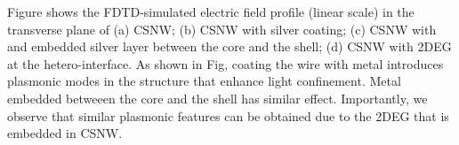 Figure shows the FDTD-simulated electric field profile (linear scale) in the
transverse plane of (a) CSNW; (b) CSNW with silver coating; (c) CSNW with and
embedded silver layer between the core and the shell; (d) CSNW with 2DEG at the
hetero-interface. As shown in Fig, coating the wire with metal introduces
plasmonic modes in the structure that enhance light confinement. Metal embedded
betweeen the core and the shell has similar effect. Importantly, we observe
that similar plasmonic features can be obtained due to the 2DEG that is
embedded in CSNW.


